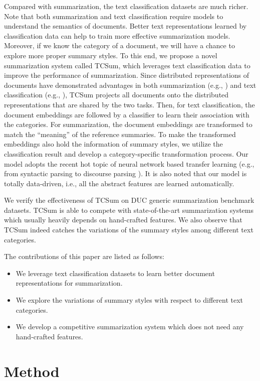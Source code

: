\documentclass[letterpaper]{article}
\begin{document}
Compared with summarization, the text classification datasets are much richer.
Note that both summarization and text classification require models to understand the semantics of documents.
Better text representations learned by classification data can help to train more effective summarization models.
Moreover, if we know the category of a document, we will have a chance to explore more proper summary styles.
To this end, we propose a novel summarization system called TCSum, which leverages text classification data to improve the performance of summarization.
Since distributed representations of documents have demonstrated advantages in both summarization (e.g., \cite{kobayashi-noguchi-yatsuka:2015:EMNLP}) and text classification (e.g., \cite{lai2015recurrent}), TCSum projects all documents onto the distributed representations that are shared by the two tasks.
Then, for text classification, the document embeddings are followed by a classifier to learn their association with the categories.
For summarization, the document embeddings are transformed to match the ``meaning'' of the reference summaries.
To make the transformed embeddings also hold the information of summary styles, we utilize the classification result and develop a category-specific transformation process.
Our model adopts the recent hot topic of neural network based transfer learning (e.g., from syntactic parsing to discourse parsing \cite{li2014recursive}).
It is also noted that our model is totally data-driven, i.e., all the abstract features are learned automatically.


We verify the effectiveness of TCSum on DUC generic summarization benchmark datasets.
TCSum is able to compete with state-of-the-art summarization systems which usually heavily depends on hand-crafted features.
We also observe that TCSum indeed catches the variations of the summary styles among different text categories.

The contributions of this paper are listed as follows:
\begin{itemize}
\item We leverage text classification datasets to learn better document representations for summarization.
\item We explore the variations of summary styles with respect to different text categories.
\item We develop a competitive summarization system which does not need any hand-crafted features.
\end{itemize}

\section{Method}
\end{document}
